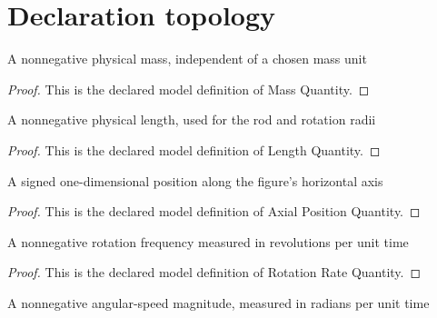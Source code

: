 \section{Declaration topology}
\begin{definition}
  \label{def:physics:phyx-mini-0696:phyxminiproblems-problemphyxmini0696-massquantity}
  A nonnegative physical mass, independent of a chosen mass unit
\end{definition}
\begin{proof}
  This is the declared model definition of Mass Quantity.
\end{proof}
\begin{definition}
  \label{def:physics:phyx-mini-0696:phyxminiproblems-problemphyxmini0696-lengthquantity}
  A nonnegative physical length, used for the rod and rotation radii
\end{definition}
\begin{proof}
  This is the declared model definition of Length Quantity.
\end{proof}
\begin{definition}
  \label{def:physics:phyx-mini-0696:phyxminiproblems-problemphyxmini0696-axialpositionquantity}
  A signed one-dimensional position along the figure's horizontal axis
\end{definition}
\begin{proof}
  This is the declared model definition of Axial Position Quantity.
\end{proof}
\begin{definition}
  \label{def:physics:phyx-mini-0696:phyxminiproblems-problemphyxmini0696-rotationratequantity}
  A nonnegative rotation frequency measured in revolutions per unit time
\end{definition}
\begin{proof}
  This is the declared model definition of Rotation Rate Quantity.
\end{proof}
\begin{definition}
  \label{def:physics:phyx-mini-0696:phyxminiproblems-problemphyxmini0696-angularspeedquantity}
  A nonnegative angular-speed magnitude, measured in radians per unit time
\end{definition}
